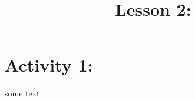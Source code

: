\documentclass{ximera}
\title{Lesson 2: }
\begin{document}
\begin{abstract}

\end{abstract}

\section*{Activity 1: }

some text
\end{document}
